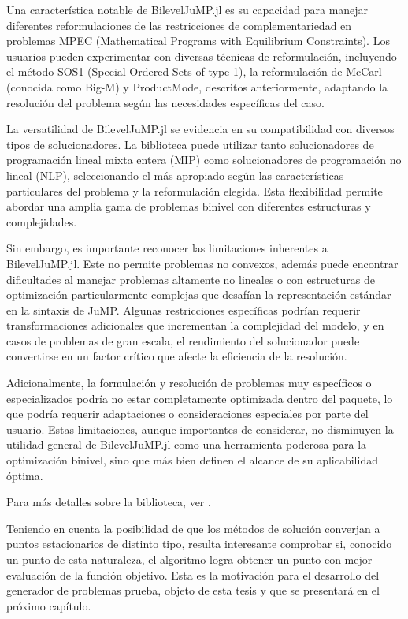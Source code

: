 Una característica notable de BilevelJuMP.jl es su capacidad para manejar diferentes reformulaciones de las restricciones de complementariedad en problemas MPEC (Mathematical Programs with Equilibrium Constraints). Los usuarios pueden experimentar con diversas técnicas de reformulación, incluyendo el método SOS1 (Special Ordered Sets of type 1), la reformulación de McCarl (conocida como Big-M) y ProductMode, descritos anteriormente, adaptando la resolución del problema según las necesidades específicas del caso.

La versatilidad de BilevelJuMP.jl se evidencia en su compatibilidad con diversos tipos de solucionadores. La biblioteca puede utilizar tanto solucionadores de programación lineal mixta entera (MIP) como solucionadores de programación no lineal (NLP), seleccionando el más apropiado según las características particulares del problema y la reformulación elegida. Esta flexibilidad permite abordar una amplia gama de problemas binivel con diferentes estructuras y complejidades.

Sin embargo, es importante reconocer las limitaciones inherentes a BilevelJuMP.jl. Este no permite problemas no convexos, además puede encontrar dificultades al manejar problemas altamente no lineales o con estructuras de optimización particularmente complejas que desafían la representación estándar en la sintaxis de JuMP. Algunas restricciones específicas podrían requerir transformaciones adicionales que incrementan la complejidad del modelo, y en casos de problemas de gran escala, el rendimiento del solucionador puede convertirse en un factor crítico que afecte la eficiencia de la resolución.

Adicionalmente, la formulación y resolución de problemas muy específicos o especializados podría no estar completamente optimizada dentro del paquete, lo que podría requerir adaptaciones o consideraciones especiales por parte del usuario. Estas limitaciones, aunque importantes de considerar, no disminuyen la utilidad general de BilevelJuMP.jl como una herramienta poderosa para la optimización binivel, sino que más bien definen el alcance de su aplicabilidad óptima.

Para más detalles sobre la biblioteca, ver \cite{BilevelJump}.


Teniendo en cuenta la posibilidad de que los métodos de solución converjan a puntos estacionarios de distinto tipo, resulta interesante comprobar si, conocido un punto de esta naturaleza, el algoritmo logra obtener un punto con  mejor evaluación de la función objetivo. Esta es la motivación para el desarrollo del generador de problemas prueba, objeto de esta tesis y que se presentará en el próximo capítulo.

